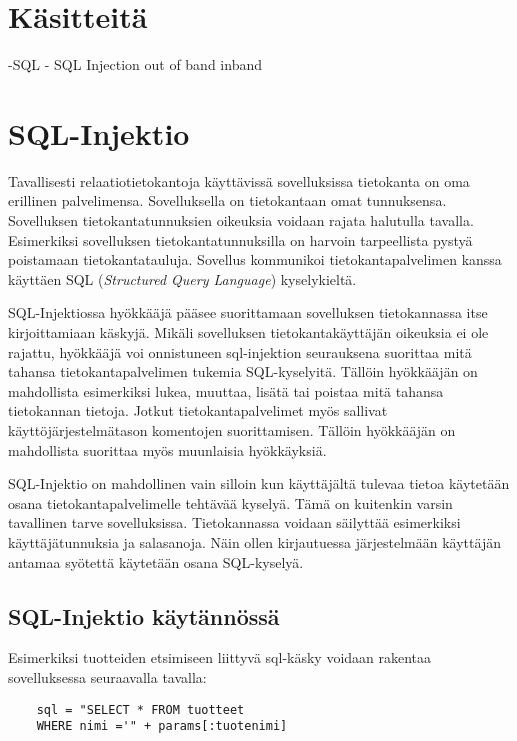 \documentclass[finnish]{tktltiki2}
\theoremstyle{definition}
\theoremstyle{remark}
\begin{document}
	\section{Käsitteitä}
	-SQL
	- SQL Injection
	out of band
	inband
	\pagebreak
	
	
	
	\section{SQL-Injektio}
	Tavallisesti relaatiotietokantoja käyttävissä sovelluksissa tietokanta on oma erillinen palvelimensa. Sovelluksella on tietokantaan omat tunnuksensa. Sovelluksen tietokantatunnuksien oikeuksia voidaan rajata halutulla tavalla. Esimerkiksi sovelluksen tietokantatunnuksilla on harvoin tarpeellista pystyä poistamaan tietokantatauluja. Sovellus kommunikoi tietokantapalvelimen kanssa käyttäen SQL (\textit{Structured Query Language}) kyselykieltä.
	
	SQL-Injektiossa hyökkääjä pääsee suorittamaan sovelluksen tietokannassa itse kirjoittamiaan käskyjä. Mikäli sovelluksen tietokantakäyttäjän oikeuksia ei ole rajattu, hyökkääjä voi onnistuneen sql-injektion seurauksena suorittaa mitä tahansa tietokantapalvelimen tukemia SQL-kyselyitä. Tällöin hyökkääjän on mahdollista esimerkiksi lukea, muuttaa, lisätä tai poistaa mitä tahansa tietokannan tietoja. Jotkut tietokantapalvelimet myös sallivat käyttöjärjestelmätason komentojen suorittamisen. Tällöin hyökkääjän on mahdollista suorittaa myös muunlaisia hyökkäyksiä. 
	
	SQL-Injektio on mahdollinen vain silloin kun käyttäjältä tulevaa tietoa käytetään osana tietokantapalvelimelle tehtävää kyselyä. Tämä on kuitenkin varsin tavallinen tarve sovelluksissa. Tietokannassa voidaan säilyttää esimerkiksi käyttäjätunnuksia ja salasanoja. Näin ollen kirjautuessa järjestelmään käyttäjän antamaa syötettä käytetään osana SQL-kyselyä.
	
	\subsection{SQL-Injektio käytännössä}
	
	Esimerkiksi tuotteiden etsimiseen liittyvä sql-käsky voidaan rakentaa sovelluksessa seuraavalla tavalla:
	
	\begin{lstlisting}
	sql = "SELECT * FROM tuotteet
	WHERE nimi ='" + params[:tuotenimi]
	\end{lstlisting}
	
\end{document}
